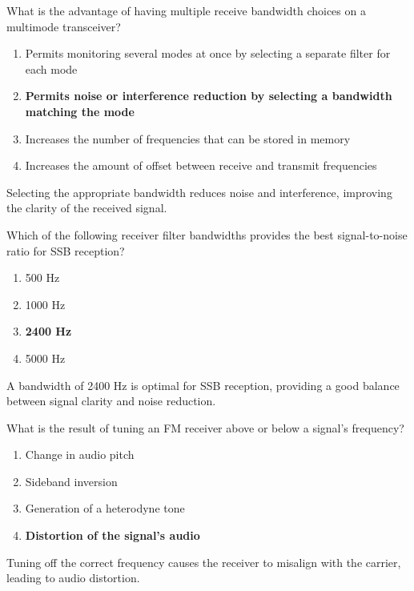 
\begin{tcolorbox}[colback=gray!10!white,colframe=black!75!black,title={T4B08}]
    What is the advantage of having multiple receive bandwidth choices on a multimode transceiver?
    \begin{enumerate}[label=\Alph*,noitemsep]
        \item Permits monitoring several modes at once by selecting a separate filter for each mode
        \item \textbf{Permits noise or interference reduction by selecting a bandwidth matching the mode}
        \item Increases the number of frequencies that can be stored in memory
        \item Increases the amount of offset between receive and transmit frequencies
    \end{enumerate}
\end{tcolorbox}
Selecting the appropriate bandwidth reduces noise and interference, improving the clarity of the received signal.


\begin{tcolorbox}[colback=gray!10!white,colframe=black!75!black,title={T4B10}]
    Which of the following receiver filter bandwidths provides the best signal-to-noise ratio for SSB reception?
    \begin{enumerate}[label=\Alph*,noitemsep]
        \item 500 Hz
        \item 1000 Hz
        \item \textbf{2400 Hz}
        \item 5000 Hz
    \end{enumerate}
\end{tcolorbox}
A bandwidth of 2400 Hz is optimal for SSB reception, providing a good balance between signal clarity and noise reduction.


\begin{tcolorbox}[colback=gray!10!white,colframe=black!75!black,title={T4B12}]
    What is the result of tuning an FM receiver above or below a signal's frequency?
    \begin{enumerate}[label=\Alph*,noitemsep]
        \item Change in audio pitch
        \item Sideband inversion
        \item Generation of a heterodyne tone
        \item \textbf{Distortion of the signal's audio}
    \end{enumerate}
\end{tcolorbox}
Tuning off the correct frequency causes the receiver to misalign with the carrier, leading to audio distortion.

